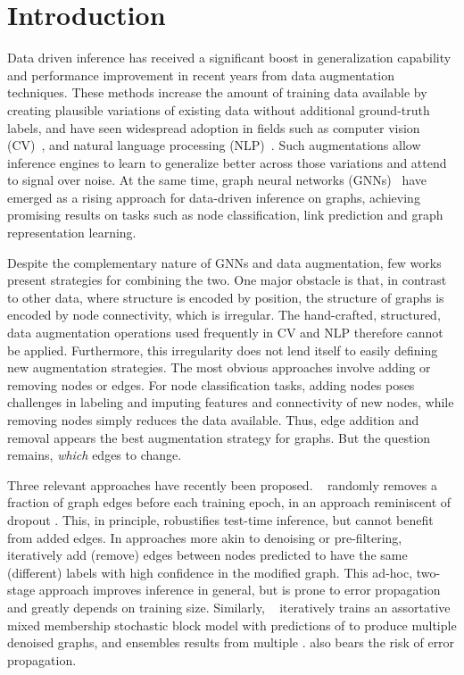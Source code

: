 \documentclass[letterpaper]{article} \usepackage{aaai21}  \usepackage{times}  \usepackage{helvet} \usepackage{courier}  \usepackage[hyphens]{url}  \usepackage{graphicx} \urlstyle{rm} \def\UrlFont{\rm}  \usepackage{natbib}  \usepackage{caption} \frenchspacing  \setlength{\pdfpagewidth}{8.5in}  \setlength{\pdfpageheight}{11in}
\begin{document}
\section{Introduction}
\label{sec:introduction}
Data driven inference has received a significant boost in generalization capability and performance improvement in recent years from data augmentation techniques. These methods increase the amount of training data available by creating plausible variations of existing data without additional ground-truth labels, and have seen widespread adoption in fields such as computer vision (CV)~\cite{devries2017improved,cubuk2019autoaugment,zhao2019data,ho2019population}, and natural language processing (NLP)~\cite{fadaee2017data,csahin2019data}. Such augmentations allow inference engines to learn to generalize better across those variations and attend to signal over noise.  At the same time, graph neural networks (GNNs)~\cite{hamilton2017inductive,kipf2016semi,velivckovic2017graph,xu2018powerful,zhang2019heterogeneous,chen2018fastgcn,wu2019comprehensive,zhang2018deep,xu2018representation} have emerged as a rising approach for data-driven inference on graphs, achieving promising results on tasks such as node classification, link prediction and graph representation learning.

Despite the complementary nature of GNNs and data augmentation, few works present strategies for combining the two. One major obstacle is that, in contrast to other data, where structure is encoded by position, the structure of graphs is encoded by node connectivity, which is irregular. The hand-crafted, structured, data augmentation operations used frequently in CV and NLP therefore cannot be applied. Furthermore, this irregularity does not lend itself to easily defining new augmentation strategies. The most obvious approaches involve adding or removing nodes or edges.  For node classification tasks, adding nodes poses challenges in labeling and imputing features and connectivity of new nodes, while removing nodes simply reduces the data available. Thus, edge addition and removal appears the best augmentation strategy for graphs. But the question remains, \emph{which} edges to change.

\newcommand{\etal}{et al.}
Three relevant approaches have recently been proposed. \dropedge~\cite{rong2019dropedge} randomly removes a fraction of graph edges before each training epoch, in an approach reminiscent of dropout \cite{srivastava2014dropout}. This, in principle, robustifies test-time inference, but cannot benefit from added edges. In approaches more akin to denoising or pre-filtering, \adaedge~\cite{chen2019measuring} iteratively add (remove) edges between nodes predicted to have the same (different) labels with high confidence in the modified graph.  This ad-hoc, two-stage approach improves inference in general, but is prone to error propagation and greatly depends on training size.  Similarly, \bgcn~\cite{zhang2019bayesian} iteratively trains an assortative mixed membership stochastic block model with predictions of \gcn to produce multiple denoised graphs, and ensembles results from multiple .  
\bgcn also bears the risk of error propagation. 
\end{document}
